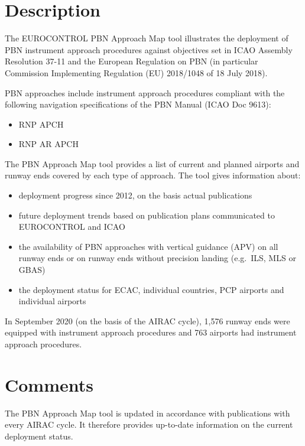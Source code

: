 \documentclass[
  11pt,
  a4paper,
]{book}
\begin{document}
\hypertarget{description-14}{%
\section{Description}\label{description-14}}

The EUROCONTROL PBN Approach Map tool illustrates the deployment of PBN
instrument approach procedures against objectives set in ICAO Assembly
Resolution 37-11 and the European Regulation on PBN (in particular
Commission Implementing Regulation (EU) 2018/1048 of 18 July 2018).

PBN approaches include instrument approach procedures compliant with the
following navigation specifications of the PBN Manual (ICAO Doc 9613):

\begin{itemize}
\item
  RNP APCH
\item
  RNP AR APCH
\end{itemize}

The PBN Approach Map tool provides a list of current and planned
airports and runway ends covered by each type of approach. The tool
gives information about:

\begin{itemize}
\item
  deployment progress since 2012, on the basis actual publications
\item
  future deployment trends based on publication plans communicated to
  EUROCONTROL and ICAO
\item
  the availability of PBN approaches with vertical guidance (APV) on all
  runway ends or on runway ends without precision landing (e.g.~ILS, MLS
  or GBAS)
\item
  the deployment status for ECAC, individual countries, PCP airports and
  individual airports
\end{itemize}

In September 2020 (on the basis of the AIRAC cycle), 1,576 runway ends
were equipped with instrument approach procedures and 763 airports had
instrument approach procedures.

\hypertarget{comments-11}{%
\section{Comments}\label{comments-11}}

The PBN Approach Map tool is updated in accordance with publications
with every AIRAC cycle. It therefore provides up-to-date information on
the current deployment status.
\end{document}
